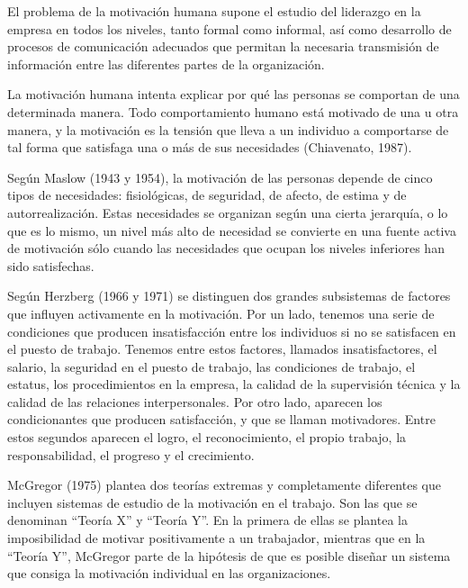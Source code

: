 \documentclass[
]{krantz}
\begin{document}
El problema de la motivación humana supone el estudio del liderazgo en la empresa en todos los niveles, tanto formal como informal, así como desarrollo de procesos de comunicación adecuados que permitan la necesaria transmisión de información entre las diferentes partes de la organización.

La motivación humana intenta explicar por qué las personas se comportan de una determinada manera. Todo comportamiento humano está motivado de una u otra manera, y la motivación es la tensión que lleva a un individuo a comportarse de tal forma que satisfaga una o más de sus necesidades (Chiavenato, 1987).

Según Maslow (1943 y 1954), la motivación de las personas depende de cinco tipos de necesidades: fisiológicas, de seguridad, de afecto, de estima y de autorrealización. Estas necesidades se organizan según una cierta jerarquía, o lo que es lo mismo, un nivel más alto de necesidad se convierte en una fuente activa de motivación sólo cuando las necesidades que ocupan los niveles inferiores han sido satisfechas.

Según Herzberg (1966 y 1971) se distinguen dos grandes subsistemas de factores que influyen activamente en la motivación. Por un lado, tenemos una serie de condiciones que producen insatisfacción entre los individuos si no se satisfacen en el puesto de trabajo. Tenemos entre estos factores, llamados insatisfactores, el salario, la seguridad en el puesto de trabajo, las condiciones de trabajo, el estatus, los procedimientos en la empresa, la calidad de la supervisión técnica y la calidad de las relaciones interpersonales. Por otro lado, aparecen los condicionantes que producen satisfacción, y que se llaman motivadores. Entre estos segundos aparecen el logro, el reconocimiento, el propio trabajo, la responsabilidad, el progreso y el crecimiento.

McGregor (1975) plantea dos teorías extremas y completamente diferentes que incluyen sistemas de estudio de la motivación en el trabajo. Son las que se denominan ``Teoría X'' y ``Teoría Y''. En la primera de ellas se plantea la imposibilidad de motivar positivamente a un trabajador, mientras que en la ``Teoría Y'', McGregor parte de la hipótesis de que es posible diseñar un sistema que consiga la motivación individual en las organizaciones.
\end{document}
